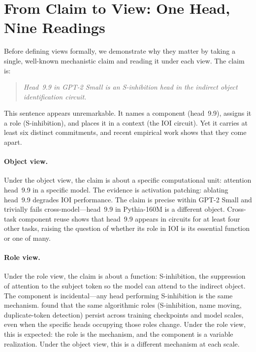 \documentclass{article}
\begin{document}
\section{From Claim to View: One Head, Nine Readings}\label{sec:motivation}

Before defining views formally, we demonstrate why they matter by
taking a single, well-known mechanistic claim and reading it under
each view.  The claim is:

\begin{quote}
\emph{Head~9.9 in GPT-2 Small is an S-inhibition head in the
indirect object identification circuit.}
\end{quote}

This sentence appears unremarkable.  It names a component (head~9.9),
assigns it a role (S-inhibition), and places it in a context (the IOI
circuit).  Yet it carries at least six distinct commitments, and recent
empirical work shows that they come apart.

\paragraph{Object view.}
Under the object view, the claim is about a specific computational unit:
attention head~9.9 in a specific model.  The evidence is activation
patching: ablating head~9.9 degrades IOI performance.  The claim is
precise within GPT-2 Small and trivially fails cross-model---head~9.9
in Pythia-160M is a different object.  Cross-task component reuse
\citep{merullo2024} shows that head~9.9 appears in circuits for at
least four other tasks, raising the question of whether its role in IOI
is its essential function or one of many.

\paragraph{Role view.}
Under the role view, the claim is about a function: S-inhibition,
the suppression of attention to the subject token so the model can
attend to the indirect object.  The component is incidental---any head
performing S-inhibition is the same mechanism.
\citet{tigges2024} found that the same algorithmic roles
(S-inhibition, name moving, duplicate-token detection) persist across
training checkpoints and model scales, even when the specific heads
occupying those roles change.  Under the role view, this is expected:
the role is the mechanism, and the component is a variable realization.
Under the object view, this is a different mechanism at each scale.
\end{document}
